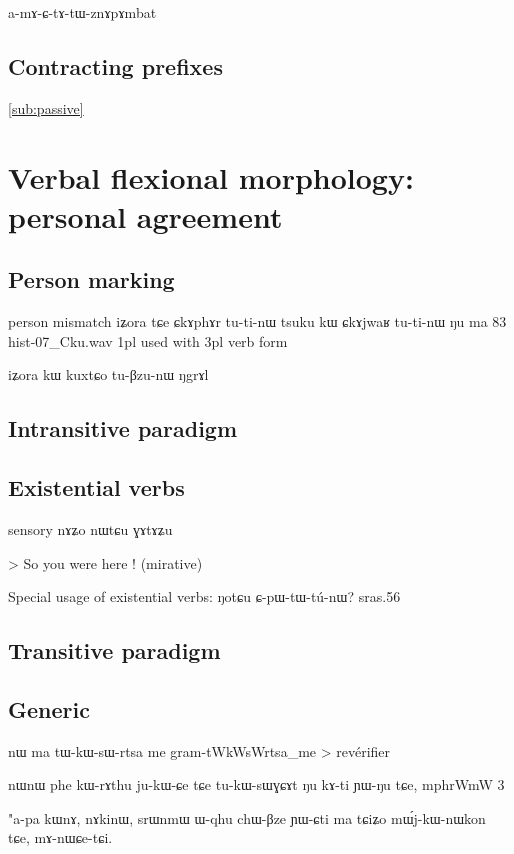 \documentclass[oldfontcommands,oneside,a4paper,11pt]{memoir}
\newcommand{\wav}[1]{}%
\begin{document}
a-mɤ-ɕ-tɤ-tɯ-znɤpɤmbat
\wav{8_template01}



\section{Contracting prefixes} \label{sec:contracting}
\ref{sub:passive}

\chapter{Verbal flexional morphology: personal agreement} \label{chapt:flexional.agr}


\section{Person marking}


person mismatch
iʑora tɕe ɕkɤphɤr tu-ti-nɯ tsuku kɯ ɕkɤjwaʁ tu-ti-nɯ ŋu ma
83
hist-07_Cku.wav
1pl used with 3pl verb form

iʑora kɯ kuxtɕo tu-βzu-nɯ ŋgrɤl
\section{Intransitive paradigm} \label{sec:intr.paradigm}
 
\section{Existential verbs} \label{sec:existential}


sensory
nɤʑo nɯtɕu ɣɤtɤʑu

> So you were here ! (mirative)


Special usage of existential verbs:
ŋotɕu ɕ-pɯ-tɯ-tú-nɯ?
sras.56

\section{Transitive paradigm} \label{sec:trans.paradigm}
\section{Generic} \label{sec:generic}


nɯ ma tɯ-kɯ-sɯ-rtsa me
gram-tWkWsWrtsa_me
> revérifier


nɯnɯ phe kɯ-rɤthu ju-kɯ-ɕe tɕe tu-kɯ-sɯɣɕɤt ŋu kɤ-ti ɲɯ-ŋu tɕe,
mphrWmW 3


"a-pa kɯnɤ, nɤkinɯ, srɯnmɯ ɯ-qhu chɯ-βze ɲɯ-ɕti ma
tɕiʑo mɯ́j-kɯ-nɯkon tɕe, mɤ-nɯɕe-tɕi.
\end{document}
